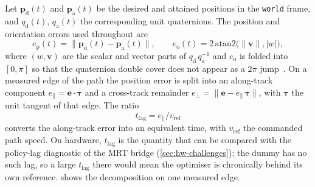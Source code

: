 Let $\symbf{p}_\mathrm{d}(t)$ and $\symbf{p}_\mathrm{a}(t)$ be the
desired and attained positions in the \texttt{world} frame, and
$q_\mathrm{d}(t)$, $q_\mathrm{a}(t)$ the corresponding unit quaternions.
The position and orientation errors used throughout are
\begin{equation}
  e_{\mathrm{p}}(t) = \lVert \symbf{p}_\mathrm{d}(t) -
    \symbf{p}_\mathrm{a}(t) \rVert,
  \qquad
  e_{\mathrm{o}}(t) = 2\,\mathrm{atan2}\bigl(\lVert \symbf{v} \rVert,
    \lvert w \rvert\bigr),
  \label{eq:ee-errors}
\end{equation}
where $(w,\symbf{v})$ are the scalar and vector parts of
$q_\mathrm{d}\,q_\mathrm{a}^{-1}$ and $e_{\mathrm{o}}$ is folded into
$[0,\pi]$ so that the quaternion double cover does not appear as a
$2\pi$ jump~\cite{Lynch2017ModernRobotics}. On a measured edge of the path
the position error is split into an along-track component
$e_{\parallel} = \symbf{e}\cdot\symbf{\tau}$ and a cross-track remainder
$e_{\perp} = \lVert \symbf{e} - e_{\parallel}\,\symbf{\tau} \rVert$, with
$\symbf{\tau}$ the unit tangent of that edge. The ratio
\begin{equation}
  t_{\mathrm{lag}} = e_{\parallel} / v_{\mathrm{ref}}
  \label{eq:lag-eff}
\end{equation}
converts the along-track error into an equivalent time, with
$v_{\mathrm{ref}}$ the commanded path speed. On hardware,
$t_{\mathrm{lag}}$ is the quantity that can be compared with the
policy-lag diagnostic of the MRT bridge
(\cref{sec:hw-challenges}); the dummy has no such lag, so a large
$t_{\mathrm{lag}}$ there would mean the optimiser is chronically behind
its own reference.  shows the decomposition on
one measured edge.


